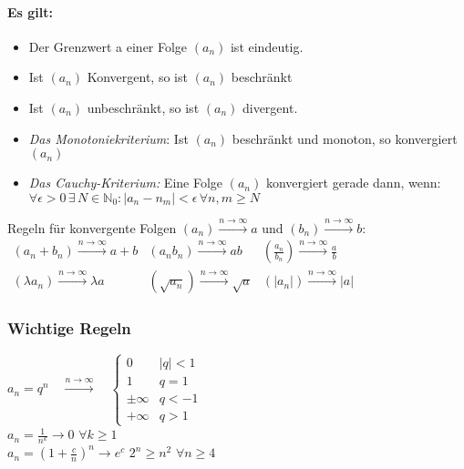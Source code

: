 \documentclass[6pt,a4paper]{scrartcl}
\newcommand{\abs}[1]{\ensuremath{\left\vert#1\right\vert}}
\begin{document}
\begin{multicols}{4}
\paragraph{Es gilt:}
\begin{itemize}\itemsep0pt
\item Der Grenzwert a einer Folge $(a_n)$ ist eindeutig.
\item Ist $(a_n)$ Konvergent, so ist $(a_n)$ beschränkt
\item Ist $(a_n)$ unbeschränkt, so ist $(a_n)$ divergent.
\item \emph{Das Monotoniekriterium}: Ist $(a_n)$ beschränkt und monoton, so konvergiert $(a_n)$
\item \emph{Das Cauchy-Kriterium:} Eine Folge $(a_n)$ konvergiert gerade dann, wenn: \\ $\forall \epsilon >0 \, \exists \,  N \in \mathbb N_0: \abs{a_n - n_m} < \epsilon \, \forall n, m \ge N$
\end{itemize}
Regeln für konvergente Folgen $(a_n) \overset{n \rightarrow \infty}{\longrightarrow} a$ und $(b_n) \overset{n \rightarrow \infty}{\longrightarrow} b$:\\
$\begin{array}{lll}
(a_n+b_n) \overset{n \rightarrow \infty}{\longrightarrow} a+b & (a_n b_n) \overset{n \rightarrow \infty}{\longrightarrow} ab & (\frac{a_n}{b_n}) \overset{n \rightarrow \infty}{\longrightarrow} \frac{a}{b}\\
(\lambda a_n) \overset{n \rightarrow \infty}{\longrightarrow} \lambda a & (\sqrt{a_n}) \overset{n \rightarrow \infty}{\longrightarrow} \sqrt{a} & (|a_n|) \overset{n \rightarrow \infty}{\longrightarrow} |a|
\end{array}$

\subsubsection{Wichtige Regeln}
$a_n=q^n \quad \overset{n \rightarrow \infty}{\longrightarrow} \quad \begin{cases} 0 & |q|<1 \\ 1 & q=1 \\ \pm \infty & q < -1  \\  + \infty & q > 1\end{cases}$ \\
$a_n=\frac{1}{n^k}\rightarrow 0$ \qquad $\forall k \ge 1$\\ 
$a_n=\left(1+\frac{c}{n}\right)^n \rightarrow e^c$ \qquad \qquad \qquad $2^n \ge n^2$ \quad $\forall n\ge 4$






\end{multicols}
\end{document}
